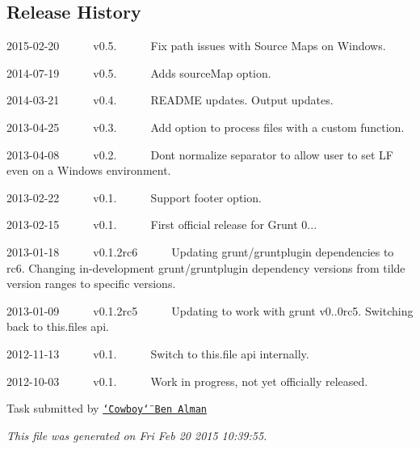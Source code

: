 \subsection*{Release History}


\begin{DoxyItemize}
\item 2015-\/02-\/20   v0.5.   \+Fix path issues with Source Maps on Windows.
\item 2014-\/07-\/19   v0.5.   \+Adds source\+Map option.
\item 2014-\/03-\/21   v0.4.   \+R\+E\+A\+D\+ME updates. Output updates.
\item 2013-\/04-\/25   v0.3.   \+Add option to process files with a custom function.
\item 2013-\/04-\/08   v0.2.   \+Don\textquotesingle{}t normalize separator to allow user to set LF even on a Windows environment.
\item 2013-\/02-\/22   v0.1.   \+Support footer option.
\item 2013-\/02-\/15   v0.1.   \+First official release for Grunt 0...
\item 2013-\/01-\/18   v0.1.\+2rc6   \+Updating grunt/gruntplugin dependencies to rc6. Changing in-\/development grunt/gruntplugin dependency versions from tilde version ranges to specific versions.
\item 2013-\/01-\/09   v0.1.\+2rc5   \+Updating to work with grunt v0..\+0rc5. Switching back to this.\+files api.
\item 2012-\/11-\/13   v0.1.   \+Switch to this.\+file api internally.
\item 2012-\/10-\/03   v0.1.   \+Work in progress, not yet officially released. 


\end{DoxyItemize}

Task submitted by \href{http://benalman.com/}{\tt \char`\"{}\+Cowboy\char`\"{} Ben Alman}

{\itshape This file was generated on Fri Feb 20 2015 10\+:39\+:55.} 